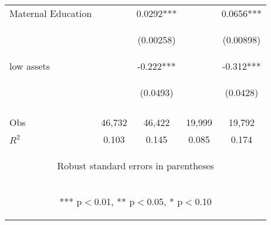 \documentclass{article}[11pt,subeqn]
\begin{document}
\begin{spacing}{1.5}
\begin{table}
\begin{center}
\begin{tabular}{lcccc}
Maternal Education	&		&	0.0292***	&		&	0.0656***	\\   
\vspace{4pt}	& \begin{footnotesize}		\end{footnotesize} & \begin{footnotesize}	(0.00258)	\end{footnotesize} & \begin{footnotesize}		\end{footnotesize} & \begin{footnotesize}	(0.00898)	\end{footnotesize} \\
low assets	&		&	-0.222***	&		&	-0.312***	\\   
\vspace{4pt}	& \begin{footnotesize}		\end{footnotesize} & \begin{footnotesize}	(0.0493)	\end{footnotesize} & \begin{footnotesize}		\end{footnotesize} & \begin{footnotesize}	(0.0428)	\end{footnotesize} \\
\begin{footnotesize}\end{footnotesize}&\begin{footnotesize}\end{footnotesize}&\begin{footnotesize}\end{footnotesize}&\begin{footnotesize}\end{footnotesize}&\begin{footnotesize}\end{footnotesize}\\									
Obs	&	46,732	&	46,422	&	19,999	&	19,792	\\   
$R^2$	&	0.103	&	0.145	&	0.085	&	0.174	\\   \midrule
\multicolumn{5}{c}{\begin{footnotesize} Robust standard errors in parentheses\end{footnotesize}} \\									
\multicolumn{5}{c}{\begin{footnotesize} *** p$<$0.01, ** p$<$0.05, * p$<$0.10 \end{footnotesize}} \\									

\end{tabular}
\end{center}
\end{table}
\end{spacing}
\end{document}
